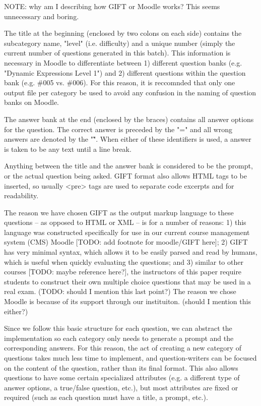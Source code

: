 \documentclass{article}
\begin{document}
NOTE: why am I describing how GIFT or Moodle works? This seems unnecessary and boring.

The title at the beginning (enclosed by two colons on each side) contains the subcategory name, "level" (i.e. difficulty) and a unique number (simply the current number
of questions generated in this batch). This information is necessary in Moodle to differentiate between 1) different question banks (e.g. "Dynamic Expressions Level 1") and
2) different questions within the question bank (e.g. \#005 vs. \#006). For this reason, it is reccomnded that only one output file per category be used to avoid any confusion
in the naming of question banks on Moodle.

The answer bank at the end (enclosed by the braces) contains all answer options for the question. The correct answer is preceded by the "=" and all wrong answers are denoted by
the "\~". When either of these identifiers is used, a answer is taken to be any text until a line break.

Anything between the title and the answer bank is
considered to be the prompt, or the actual question being asked. GIFT format also allows HTML tags to be inserted,
so usually <pre> tags are used to separate code excerpts and for readability.

The reason we have chosen GIFT as the output markup language to these questions -- as opposed to HTML or XML -- is for a number of reasons: 1) this language was constructed specifically for use in our current course management system (CMS) Moodle [TODO: add footnote for moodle/GIFT here]; 2) GIFT has very minimal syntax, which allows it to be easily parsed and read by humans, which is useful when quickly evaluating the questions; and 3) similar to other courses [TODO: maybe reference here?], the instructors of this paper require students to construct their own multiple choice questions that may be used in a real exam. (TODO: should I mention this last point?) The reason we chose Moodle is because of its support through our instituiton. (should I mention this either?)

Since we follow this basic structure for each question, we can abstract the implementation so each category
only needs to generate a prompt and the corresponding answers. For this reason, the act of creating a new
category of questions takes much less time to implement, and question-writers can be focused on the content of
the question, rather than its final format. This also allows questions to have some certain specialized attributes
(e.g. a different type of answer options, a true/false question, etc.), but most attributes are fixed or required (such as each question
must have a title, a prompt, etc.).
\end{document}
